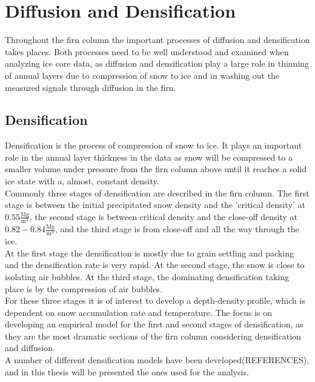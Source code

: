 \documentclass[../../CompleteThesis/Complete_1stDraft.tex]{subfiles}
\begin{document}
\section[Diffusion and Densification][Diffusion and Densification]{Diffusion and Densification}
\label{Sec:Ice_DiffusionAndDensification}
Throughout the firn column the important processes of diffusion and densification takes places. Both processes need to be well understood and examined when analyzing ice core data, as diffusion and densification play a large role in thinning of annual layers due to compression of snow to ice and in washing out the measured signals through diffusion in the firn.
\subsection[Densification][Densification]{Densification}
\label{Subsec:Ice_DiffusionAndDensification_Densification}
Densification is the process of compression of snow to ice. It plays an important role in the annual layer thickness in the data as snow will be compressed to a smaller volume under pressure from the firn column above until it reaches a solid ice state with a, almost, constant density. \\
Commonly three stages of densification are described in the firn column. The first stage is between the initial precipitated snow density and the 'critical density' at $0.55 \frac{\text{Mg}}{\text{m}^3}$, the second stage is between critical density and the close-off density at $0.82-0.84 \frac{\text{Mg}}{\text{m}^3}$, and the third stage is from close-off and all the way through the ice.\\
At the first stage the densification is mostly due to grain settling and packing and the densification rate is very rapid. At the second stage, the snow is close to isolating air bubbles. At the third stage, the dominating densification taking place is by the compression of air bubbles.\\
For these three stages it is of interest to develop a depth-density profile, which is dependent on snow accumulation rate and temperature. The focus is on developing an empirical model for the first and second stages of densification, as they are the most dramatic sections of the firn column considering densification and diffusion.\\
A number of different densification models have been developed(REFERENCES), and in this thesis will be presented the ones used for the analysis.
\end{document}
